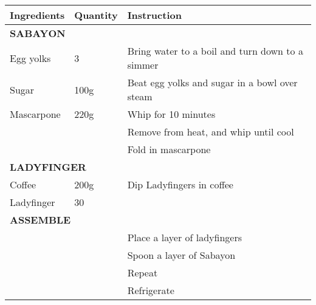 \documentclass{article}
\newcommand{\tabletitle}[1]{\midrule\multicolumn{3}{l}{\textbf{\color{BrickRed} \MakeUppercase{#1}}}}
\begin{document}
\begin{tabular}{lll} \toprule
  \textbf{Ingredients} & \textbf{Quantity} & \textbf{Instruction}                            \\
  \tabletitle{Sabayon}                                                                                                                   \\
  Egg yolks            & 3                 & Bring water to a boil and turn down to a simmer \\
  Sugar                & 100g              & Beat egg yolks and sugar in a bowl over steam   \\
  Mascarpone           & 220g              & Whip for 10 minutes                             \\
                       &                   & Remove from heat, and whip until cool           \\
                       &                   & Fold in mascarpone                              \\
  \tabletitle{Ladyfinger}                                                                    \\
  Coffee               & 200g              & Dip Ladyfingers in coffee                       \\
  Ladyfinger           & 30                &                                                 \\
  \tabletitle{Assemble}                                                                      \\
                       &                   & Place a layer of ladyfingers                    \\
                       &                   & Spoon a layer of Sabayon                        \\
                       &                   & Repeat                                          \\
                       &                   & Refrigerate                                     \\
  \bottomrule
\end{tabular}
\end{document}
